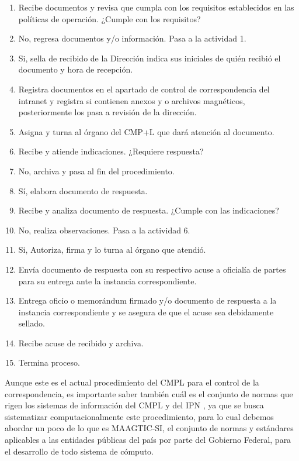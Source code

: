 	\begin{enumerate}
		\item Recibe documentos y revisa que cumpla con los requisitos establecidos en las políticas de operación. ¿Cumple con los requisitos?
		\item No, regresa documentos y/o información. Pasa a la actividad 1.
		\item Si, sella de recibido de la Dirección indica sus iniciales de quién recibió el documento y hora de recepción.
		\item Registra documentos en el apartado de control de correspondencia del intranet y registra si contienen anexos y o archivos magnéticos, posteriormente los pasa a revisión de la dirección.
		\item Asigna y turna al órgano del CMP+L que dará atención al documento.
		\item Recibe y atiende indicaciones. ¿Requiere respuesta?
		\item No, archiva y pasa al fin del procedimiento.
		\item Sí, elabora documento de respuesta.
		\item Recibe y analiza documento de respuesta. ¿Cumple con las indicaciones?
		\item  No, realiza observaciones. Pasa a la actividad 6.
		\item Si, Autoriza, firma y lo turna al órgano que atendió.
		\item  Envía documento de respuesta con su respectivo acuse a oficialía de partes para su entrega ante la instancia correspondiente.
		\item Entrega oficio o memorándum firmado y/o documento de respuesta a la instancia correspondiente y se asegura de que el acuse sea debidamente sellado.
		\item Recibe acuse de recibido y archiva.
		\item Termina proceso.
	\end{enumerate}
	
	Aunque este es el actual procedimiento del CMPL para el control de la correspondencia, es importante saber también cuál es el conjunto de normas que rigen los sistemas de información del CMPL y del IPN , ya que se busca sistematizar computacionalmente este procedimiento, para lo cual debemos abordar un poco de lo que es MAAGTIC-SI, el conjunto de normas y estándares aplicables a las entidades públicas del país por parte del Gobierno Federal, para el desarrollo de todo sistema de cómputo.
	
